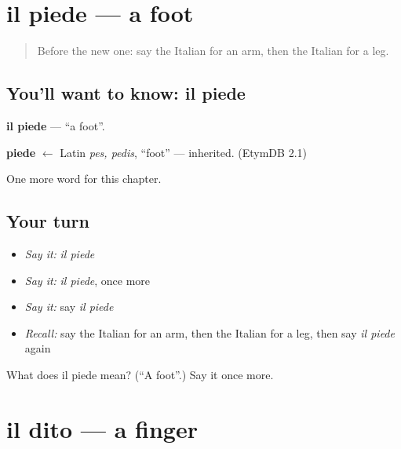 \section[il piede]{il piede — a foot}

\label{lesson:IT-C37-piede}



\begin{quote}
Before the new one: say the Italian for an arm, then the Italian for a leg.
\end{quote}

\subsection*{You'll want to know: il piede}
\textbf{il piede} — \textquotedblleft{}a foot\textquotedblright{}.

\begin{cousinweb}
\textbf{piede} $\leftarrow$ Latin \emph{pes, pedis}, \textquotedblleft{}foot\textquotedblright{} — inherited. (EtymDB 2.1)
\end{cousinweb}

\begin{grammarlens}[title={What you've built}]
One more word for this chapter.
\end{grammarlens}

\subsection*{Your turn}
\begin{itemize}
\raggedright
  \item \emph{Say it:} \emph{il piede}
  \item \emph{Say it:} \emph{il piede}, once more
  \item \emph{Say it:} say \emph{il piede}
  \item \emph{Recall:} say the Italian for an arm, then the Italian for a leg, then say \emph{il piede} again
\end{itemize}

\begin{tcolorbox}[breakable,colback=teal!4,colframe=teal!35!black,title={Before you move on}]
What does il piede mean? (\textquotedblleft{}A foot\textquotedblright{}.) Say it once more.
\end{tcolorbox}
\section[il dito]{il dito — a finger}

